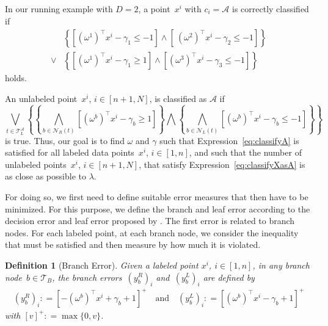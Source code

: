 \documentclass[a4paper,american,reqno]{amsart}
\newtheorem{defi}{Definition}
\newcommand{\define}{\mathrel{{\mathop:}{=}}}
\newcommand{\set}[1]{\{#1\}}
\begin{document}
In our running example with $D=2$, a point~$x^i$ with $c_i
=\mathcal{A}$ is correctly classified if
\begin{align*}
  & \left\{\left  [\left(\omega^1\right)^\top x^i -  \gamma_1 \leq - 1
    \right] \wedge \left  [\ \left(\omega^2\right)^\top x^i -  \gamma_2
    \leq - 1  \right] \right\}
  \\
  \vee
  & \left\{ \left
    [\left(\omega^1\right)^\top x^i -  \gamma_1 \geq 1  \right] \wedge
    \left  [\left(\omega^3\right)^\top x^i -  \gamma_3 \leq - 1
    \right]\right\}
\end{align*}
holds.

An unlabeled point~$x^i$, $i \in [n +1, N]$, is classified as
$\mathcal{A}$ if
\begin{equation}
  \label{eq:classifyXasA}
  \bigvee_{t\in \mathcal{T}_L^{\mathcal{A}} } \left \{ \left \{
      \bigwedge_{b \in \mathcal{N}_R(t)} \left[ \left(\omega^b\right)^\top
        x^i -  \gamma_b \geq 1 \right] \right\} \bigwedge \left \{ \bigwedge_{b
        \in \mathcal{N}_L(t)} \left[ \left(\omega^b\right)^\top x^i -
        \gamma_b \leq -1 \right] \right\}  \right\}
\end{equation}
is true.
Thus, our goal is to find $\omega$ and $\gamma$ such that
Expression~\eqref{eq:classifyA} is satisfied for all labeled
data points~$x^i$, $i \in [1,n]$, and such that the number of
unlabeled points~$x^i$, $i \in [n +1 , N]$, that satisfy
Expression~\eqref{eq:classifyXasA} is as close as possible to
$\lambda$.

For doing so, we first need to define suitable error measures that
then have to be minimized.
For this purpose, we define the branch and leaf error according to the
decision error and leaf error proposed by \textcite{bennett1996optimal}.
The first error is related to branch nodes.
For each labeled point, at each branch node, we consider the
inequality that must be satisfied and then measure by how much it is
violated.

\begin{defi}[Branch Error]
  Given a labeled point $x^i$, $i \in [1,n]$, in any branch node~$b
  \in\mathcal{T}_B$, the \emph{branch errors}~$\left(y_b^R\right)_i$
  and~$\left(y_b^L\right)_i $ are defined by
  \begin{align*}
    \left(y_b^R\right)_i
    \define \left[-\left(\omega^b\right)^\top x^i +  \gamma_b +1
    \right]^{+}
    \quad\text{and}\quad
    \left(y_b^L\right)_i
    \define \left[\left(\omega^b\right)^\top x^i -  \gamma_b +1
    \right]^{+}
  \end{align*}
  with $[v]^+ \define \max \set{0, v}$.
\end{defi}
\end{document}
